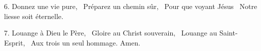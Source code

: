 {6. Donnez une vie pure,~\newline
Préparez un chemin sûr,~\newline
Pour que voyant Jésus~\newline
Notre liesse soit éternelle.}
\par
{}
{7. Louange à Dieu le Père,~\newline
Gloire au Christ souverain,~\newline
Louange au Saint-Esprit,~\newline
Aux trois un seul hommage. Amen.}
